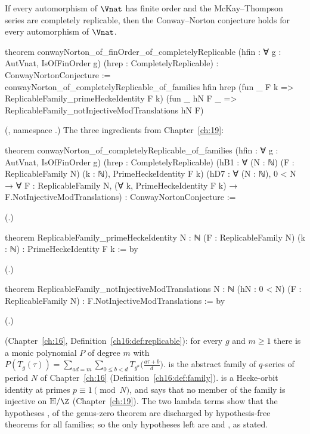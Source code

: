 \begin{theorem}\label{ch20:thm:cnrep}
If every automorphism of $\Vnat$ has finite order and the McKay--Thompson series are completely replicable, then the
Conway--Norton conjecture holds for every automorphism of $\Vnat$.
\end{theorem}
\begin{leancode}
theorem conwayNorton_of_finOrder_of_completelyReplicable
    (hfin : ∀ g : AutVnat, IsOfFinOrder g) (hrep : CompletelyReplicable) :
    ConwayNortonConjecture :=
  conwayNorton_of_completelyReplicable_of_families hfin hrep
    (fun _ F k => ReplicableFamily_primeHeckeIdentity F k)
    (fun _ hN F _ => ReplicableFamily_notInjectiveModTranslations hN F)
\end{leancode}
(, namespace .)  The three
ingredients from Chapter~\ref{ch:19}:
\begin{leancode}
theorem conwayNorton_of_completelyReplicable_of_families (hfin : ∀ g : AutVnat, IsOfFinOrder g)
    (hrep : CompletelyReplicable)
    (hB1 : ∀ (N : ℕ) (F : ReplicableFamily N) (k : ℕ), PrimeHeckeIdentity F k)
    (hD7 : ∀ (N : ℕ), 0 < N → ∀ F : ReplicableFamily N, (∀ k, PrimeHeckeIdentity F k) →
      F.NotInjectiveModTranslations) :
    ConwayNortonConjecture :=
\end{leancode}
(.)
\begin{leancode}
theorem ReplicableFamily_primeHeckeIdentity {N : ℕ} (F : ReplicableFamily N) (k : ℕ) :
    PrimeHeckeIdentity F k := by
\end{leancode}
(.)
\begin{leancode}
theorem ReplicableFamily_notInjectiveModTranslations {N : ℕ} (hN : 0 < N)
    (F : ReplicableFamily N) : F.NotInjectiveModTranslations := by
\end{leancode}
(.)
\begin{dictionary}
 (Chapter~\ref{ch:16}, Definition~\ref{ch16:def:replicable}): for every $g$ and $m\ge1$ there is a
monic polynomial $P$ of degree $m$ with $P(T_g(\tau))=\sum_{ad=m}\sum_{0\le b<d}T_{g^a}\bigl(\tfrac{a\tau+b}d\bigr)$.
 is the abstract family of $q$-series of period $N$ of Chapter~\ref{ch:16}
(Definition~\ref{ch16:def:family}).   is a Hecke-orbit identity at primes $p\equiv1\pmod N$, and
 says that no member of the family is injective on $\mathbb H/\Z$ (Chapter~\ref{ch:19}).
The two lambda terms show that the hypotheses ,  of the genus-zero theorem are discharged by
hypothesis-free theorems for all families; so the only hypotheses left are  and , as stated.
\end{dictionary}
